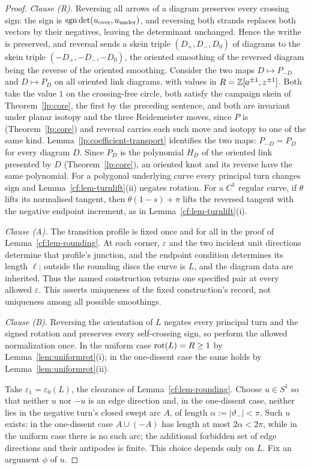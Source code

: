 \begin{proof}
\emph{Clause (R).}
Reversing all arrows of a diagram preserves every crossing sign: the sign
is $\operatorname{sgn}\det(u_{\mathrm{over}},u_{\mathrm{under}})$, and reversing both
strands replaces both vectors by their negatives, leaving the determinant
unchanged. Hence the writhe is preserved, and reversal sends a skein triple
$(D_+,D_-,D_0)$ of diagrams to the skein triple $(-D_+,-D_-,-D_0)$, the
oriented smoothing of the reversed diagram being the reverse of the
oriented smoothing. Consider the two maps $D\mapsto P_{-D}$ and
$D\mapsto P_D$ on all oriented link diagrams, with values in
$R=\mathbb Z[a^{\pm1},z^{\pm1}]$. Both take the value $1$ on the crossing-free
circle, both satisfy the campaign skein of Theorem~\ref{lp:core}, the
first by the preceding sentence, and both are invariant under planar
isotopy and the three Reidemeister moves, since $P$ is
(Theorem~\ref{lp:core}) and reversal carries each such move and isotopy
to one of the same kind. Lemma~\ref{lp:coefficient-transport} identifies
the two maps: $P_{-D}=P_D$ for every diagram $D$. Since $P_D$ is the
polynomial $H_D$ of the oriented link presented by $D$
(Theorem~\ref{lp:core}), an oriented knot and its reverse have the same
polynomial. For a polygonal underlying curve every principal turn changes
sign and Lemma~\ref{cf:lem-turnlift}(ii) negates rotation. For a $C^1$
regular curve, if $\theta$ lifts its normalised tangent, then
$\theta(1-s)+\pi$ lifts the reversed tangent with the negative endpoint
increment, as in Lemma~\ref{cf:lem-turnlift}(i).

\emph{Clause (A).} The transition profile is fixed once and for all in the proof of
Lemma~\ref{cf:lem-rounding}.  At each corner, $\varepsilon$ and the two incident
unit directions determine that profile's junction, and the endpoint condition
determines its length $\ell$; outside the rounding discs the curve is $L$, and
the diagram data are inherited.  Thus the named construction returns one
specified pair at every allowed $\varepsilon$.  This asserts uniqueness of the
fixed construction's record, not uniqueness among all possible smoothings.

\emph{Clause (B).}
Reversing the orientation of $L$ negates every principal turn and the signed rotation and
preserves every self-crossing sign, so perform the allowed normalization once. In the
uniform case $\operatorname{rot}(L)=R\geq1$ by Lemma~\ref{lem:uniformrot}(i); in the one-dissent case the same holds by Lemma~\ref{lem:uniformrot}(ii).

Take $\varepsilon_1=\varepsilon_0(L)$, the clearance of Lemma~\ref{cf:lem-rounding}.
Choose $u\in S^1$ so that neither $u$ nor $-u$ is an edge direction and, in the
one-dissent case, neither lies in the negative turn's closed swept arc $A$, of
length $\alpha:=|\vartheta_-|<\pi$. Such $u$ exists: in the one-dissent case $A\cup(-A)$
has length at most $2\alpha<2\pi$, while in the uniform case there is no such arc; the additional
forbidden set of edge directions and their antipodes is finite. This choice depends only on $L$. Fix an argument $\phi$ of $u$.


\end{proof}
